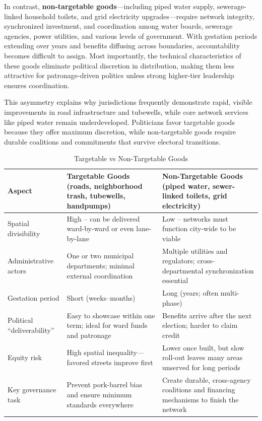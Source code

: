 In contrast, \textbf{non-targetable goods}—including piped water supply, sewerage-linked household toilets, and grid electricity upgrades—require network integrity, synchronized investment, and coordination among water boards, sewerage agencies, power utilities, and various levels of government. With gestation periods extending over years and benefits diffusing across boundaries, accountability becomes difficult to assign. Most importantly, the technical characteristics of these goods eliminate political discretion in distribution, making them less attractive for patronage-driven politics unless strong higher-tier leadership ensures coordination.

This asymmetry explains why jurisdictions frequently demonstrate rapid, visible improvements in road infrastructure and tubewells, while core network services like piped water remain underdeveloped. Politicians favor targetable goods because they offer maximum discretion, while non-targetable goods require durable coalitions and commitments that survive electoral transitions.

\begin{table}[H]
\centering
\caption{Targetable vs Non-Targetable Goods}
\label{tab:targetable-non-targetable}
\small
\begin{tabularx}{\textwidth}{|l|X|X|}
\hline
\textbf{Aspect} & \textbf{Targetable Goods} (roads, neighborhood trash, tubewells, handpumps) & \textbf{Non-Targetable Goods} (piped water, sewer-linked toilets, grid electricity) \\
\hline
Spatial divisibility & High – can be delivered ward-by-ward or even lane-by-lane & Low – networks must function city-wide to be viable \\
\hline
Administrative actors & One or two municipal departments; minimal external coordination & Multiple utilities and regulators; cross-departmental synchronization essential \\
\hline
Gestation period & Short (weeks–months) & Long (years; often multi-phase) \\
\hline
Political “deliverability” & Easy to showcase within one term; ideal for ward funds and patronage & Benefits arrive after the next election; harder to claim credit \\
\hline
Equity risk & High spatial inequality—favored streets improve first & Lower once built, but slow roll-out leaves many areas unserved for long periods \\
\hline
Key governance task & Prevent pork-barrel bias and ensure minimum standards everywhere & Create durable, cross-agency coalitions and financing mechanisms to finish the network \\
\hline
\end{tabularx}
\end{table}

